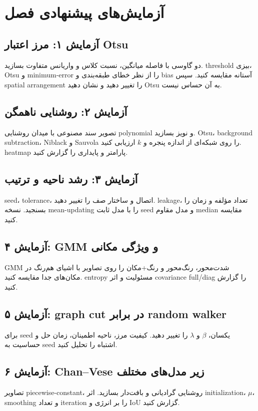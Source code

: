 \documentclass[12pt,openany,oneside]{book}
\begin{document}
\section{آزمایش‌های پیشنهادی فصل}
\subsection{آزمایش ۱: مرز اعتبار Otsu}
دو گاوسی با فاصله میانگین، نسبت کلاس و واریانس متفاوت بسازید. threshold بیزی، Otsu و minimum-error را از نظر
خطای طبقه‌بندی و bias آستانه مقایسه کنید. سپس spatial arrangement را تغییر دهید و نشان دهید Otsu به آن حساس نیست.

\subsection{آزمایش ۲: روشنایی ناهمگن}
تصویر سند مصنوعی با میدان روشنایی polynomial و نویز بسازید. Otsu، background subtraction، Niblack و Sauvola را
روی شبکه‌ای از اندازه پنجره و \(k\) ارزیابی کنید. heatmap پارامتر و پایداری را گزارش کنید.

\subsection{آزمایش ۳: رشد ناحیه و ترتیب}
seed، tolerance، اتصال و ساختار صف را تغییر دهید. leakage، تعداد مؤلفه و زمان را بسنجید. نسخه mean-updating را با
مدل ثابت seed و مدل مقاوم median مقایسه کنید.

\subsection{آزمایش ۴: GMM و ویژگی مکانی}
GMM شدت‌محور، رنگ‌محور و رنگ+مکان را روی تصاویر با اشیای هم‌رنگ در مکان‌های جدا مقایسه کنید. entropy مسئولیت و
اثر covariance full/diag را گزارش کنید.

\subsection{آزمایش ۵: graph cut در برابر random walker}
برای seed یکسان، \(\beta\) و \(\lambda\) را تغییر دهید. کیفیت مرز، ناحیه اطمینان، زمان حل و حساسیت به seed اشتباه
را تحلیل کنید.

\subsection{آزمایش ۶: Chan--Vese زیر مدل‌های مختلف}
تصاویر piecewise-constant، روشنایی گرادیانی و بافت‌دار بسازید. اثر initialization، \(\mu\)، smoothing و تعداد iteration
را بر انرژی و IoU گزارش کنید.
\end{document}
